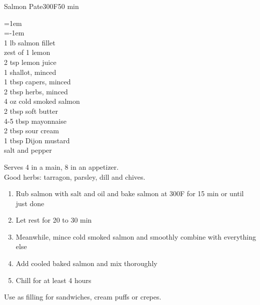 \documentclass{article}
\newenvironment{recipe}[3][]
    {\begin{cardbase}[#1]{#2}{#3}
    \columnratio{0.333}
    \begin{paracol}{2}}
    {\end{paracol}\end{cardbase}}
\newenvironment{denserecipe}[3][]
    {\small
    \begin{recipe}[#1]{#2}{#3}}
    {\end{recipe}}
\newcommand{\nextcolumn}{\switchcolumn}
\newenvironment{ingredients}
    {
    \begin{obeylines}
    \vspace{\parskip}
    \setlength{\parskip}{0.25em}
    \vspace{-0.25em}
    \leftskip=1em
    \parindent=-1em}
    {\end{obeylines}}
\newenvironment{steps}
    {\begin{enumerate}[leftmargin=*,topsep=0pt]}
    {\end{enumerate}}
\newcommand{\fahrenheit}[1]{#1\textdegree{}F}
\newcommand{\tag}[1]{\hspace{1em}#1}
\newcommand{\symboltag}[2]{\tag{#1\hspace{0.4em}#2}}
\newcommand{\totaltime}[1]{\symboltag{\raisebox{-0.1em}{\small\StopWatchEnd}}{#1}}
\begin{document}
\begin{denserecipe}{Salmon Pate}{\fahrenheit{300}\totaltime{50 min}}
\begin{ingredients}
1 lb salmon fillet
zest of 1 lemon
2 tsp lemon juice
1 shallot, minced
1 tbsp capers, minced
2 tbsp herbs, minced
4 oz cold smoked salmon
2 tbsp soft butter
4-5 tbsp mayonnaise
2 tbsp sour cream
1 tbsp Dijon mustard
salt and pepper
\end{ingredients}
\nextcolumn
Serves 4 in a main, 8 in an appetizer. \\
Good herbs: tarragon, parsley, dill and chives.
\begin{steps}
\item Rub salmon with salt and oil and bake salmon at \fahrenheit{300} for 15 min or until just done
\item Let rest for 20 to 30 min
\item Meanwhile, mince cold smoked salmon and smoothly combine with everything else
\item Add cooled baked salmon and mix thoroughly
\item Chill for at least 4 hours
\end{steps}
Use as filling for sandwiches, cream puffs or crepes. 
\end{denserecipe}
\end{document}

